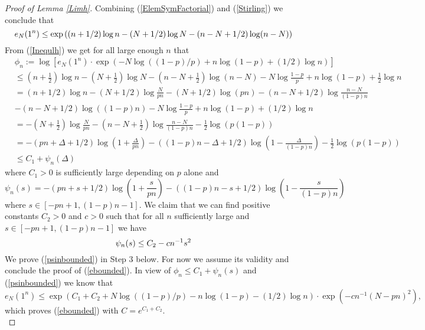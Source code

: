 \begin{proof}[Proof of Lemma \ref{Limh}]
Combining (\ref{ElemSymFactorial}) and (\ref{Stirling}) we conclude that 
\begin{equation}{\label{Inequlh}}
	e_{N}(1^n)\leq \exp\left((n+1/2)\log n-(N+1/2)\log N-(n-N+1/2)\log (n-N)\right)
\end{equation}
From (\ref{Inequlh}) we get for all large enough $n$ that
\begin{equation*}
\begin{split}
	&\phi_{n}:=\log\left[e_{N}(1^n)\cdot\exp\left(-N\log((1-p)/p)+n\log(1-p)+(1/2)\log n\right)\right]\\
	&\leq (n+\frac{1}{2})\log n-(N+\frac{1}{2})\log N-(n-N+\frac{1}{2})\log (n-N)-N\log\frac{1-p}{p}+n\log(1-p)+\frac{1}{2}\log n\\
	& =(n+1/2)\log n-(N+1/2)\log \frac{N}{pn}-(N+1/2)\log (pn)-(n-N+1/2)\log\frac{n-N}{(1-p)n}\\
	& -(n-N+1/2)\log((1-p)n)-N\log\frac{1-p}{p}+n\log(1-p)+(1/2)\log n\\
	&=-(N+\frac{1}{2})\log\frac{N}{pn}-(n-N+\frac{1}{2})\log\frac{n-N}{(1-p)n}-\frac{1}{2}\log \left(p(1-p)\right)\\
	& =-(pn+\Delta+1/2)\log \left(1+\frac{\Delta}{pn}\right)-((1-p)n-\Delta+1/2)\log\left(1-\frac{\Delta}{(1-p)n}\right)-\frac{1}{2}\log \left(p(1-p)\right)\\
	&\leq C_{1}+\psi_{n}(\Delta)
\end{split}
\end{equation*}
where $C_{1}>0$ is sufficiently large depending on $p$ alone and
\begin{equation}
	\psi_{n}(s)=-(pn+s+1/2)\log\left(1+\frac{s}{pn}\right)-((1-p)n-s+1/2)\log\left(1-\frac{s}{(1-p)n}\right)
\end{equation}
where $s\in [-pn+1,(1-p)n-1]$. We claim that we can find positive constants $C_2>0$ and $c>0$ such that for all $n$ sufficiently large and $s\in[-pn+1,(1-p)n-1]$ we have
\begin{equation}{\label{psinbounded}}
	\psi_{n}(s)\leq C_2-cn^{-1}s^{2}
\end{equation}
We prove (\ref{psinbounded}) in Step 3 below. For now we assume its validity and conclude the proof of (\ref{ebounded}).
In view of $\phi_{n}\leq C_1+\psi_{n}(s)$ and (\ref{psinbounded}) we know that
\begin{equation*}
	e_{N}(1^n)\leq \exp\left(C_1+C_2+N\log((1-p)/p)-n\log(1-p)-(1/2)\log n\right)\cdot\exp(-cn^{-1}(N-pn)^2),
\end{equation*}
which proves (\ref{ebounded}) with $C=e^{C_1+C_2}$.\\

\end{proof}
